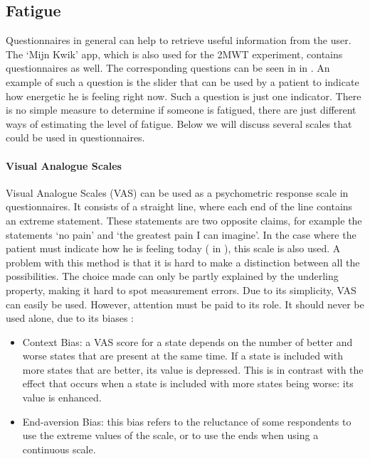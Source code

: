 \subsection{Fatigue}
Questionnaires in general can help to retrieve useful information from the user.
The `Mijn Kwik' app, which is also used for the 2MWT experiment, contains questionnaires as well.
The corresponding questions can be seen in  in .
An example of such a question is the slider that can be used by a patient to indicate how energetic he is feeling right now.
Such a question is just one indicator.
There is no simple measure to determine if someone is fatigued, there are just different ways of estimating the level of fatigue.
Below we will discuss several scales that could be used in questionnaires.

\paragraph{Visual Analogue Scales}
Visual Analogue Scales (VAS) can be used as a psychometric response scale in questionnaires. 
It consists of a straight line, where each end of the line contains an extreme statement.
These statements are two opposite claims, for example the statements `no pain' and `the greatest pain I can imagine'. 
In the case where the patient must indicate how he is feeling today ( in ), this scale is also used.
A problem with this method is that it is hard to make a distinction between all the possibilities.
The choice made can only be partly explained by the underling property, making it hard to spot measurement errors.
Due to its simplicity, VAS can easily be used.
However, attention must be paid to its role.
It should never be used alone, due to its biases \cite{torrance2001visual}:
%
\begin{itemize}
	\item Context Bias: a VAS score for a state depends on the number of better and worse states that are present at the same time.
	If a state is included with more states that are better, its value is depressed.
	This is in contrast with the effect that occurs when a state is included with more states being worse: its value is enhanced.
	
	\item End-aversion Bias: this bias refers to the reluctance of some respondents to use the extreme values of the scale, or to use the ends when using a continuous scale.
	
\end{itemize}
%

